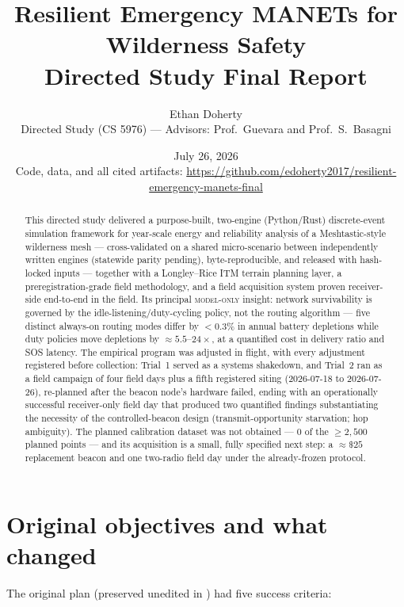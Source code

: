 \documentclass[11pt]{article}
\title{\textbf{Resilient Emergency MANETs for Wilderness Safety}\\[4pt]
\large Directed Study Final Report}
\author{Ethan Doherty\\\small Directed Study (CS 5976) --- Advisors: Prof.~Guevara and Prof.~S.~Basagni}
\date{July 26, 2026\\[3pt]
\small Code, data, and all cited artifacts:
\url{https://github.com/edoherty2017/resilient-emergency-manets-final}}
\newcommand{\modelonly}{\textsc{model-only}}
\begin{document}
\maketitle

\begin{abstract}
\noindent This directed study delivered a purpose-built, two-engine
(Python/Rust) discrete-event simulation framework for year-scale energy and
reliability analysis of a Meshtastic-style wilderness mesh --- cross-validated on a shared micro-scenario between independently written engines (statewide parity pending), byte-reproducible, and released with hash-locked inputs --- together with a Longley--Rice ITM terrain planning
layer, a preregistration-grade field methodology, and a field acquisition system proven receiver-side end-to-end in the field. Its principal \modelonly{} insight:
network survivability is governed by the idle-listening/duty-cycling policy,
not the routing algorithm --- five distinct always-on routing modes differ by
$<0.3\%$ in annual battery depletions while duty policies move depletions by
${\approx}5.5$--$24\times$, at a quantified cost in delivery ratio and SOS
latency. The empirical program was adjusted in flight, with every adjustment
registered before collection: Trial~1 served as a systems shakedown, and
Trial~2 ran as a field campaign of four field days plus a fifth registered
siting (2026-07-18 to 2026-07-26), re-planned after the beacon node's
hardware failed, ending with an operationally successful receiver-only field
day that produced two quantified findings substantiating the necessity of the controlled-beacon design (transmit-opportunity starvation; hop ambiguity). The planned
calibration dataset was not obtained --- 0 of the ${\geq}2{,}500$ planned points --- and its acquisition is a small, fully specified next step: a
${\approx}\$25$ replacement beacon and one two-radio field day under the
already-frozen protocol.
\end{abstract}

\section{Original objectives and what changed}\label{sec:objectives}

The original plan (preserved unedited in )
had five success criteria:
\end{document}
